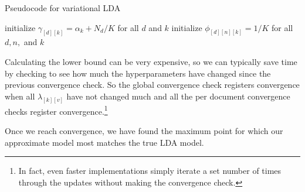 \documentclass[12pt]{article}
\begin{document}
\begin{algorithm}[H]
    \caption{Pseudocode for variational LDA}
    \DontPrintSemicolon
    initialize $\gamma_{[d][k]} = \alpha_{k} + N_{d} / K$ for all $d$ and $k$\;
    initialize $\phi_{[d][n][k]} = 1 / K$ for all $d, n,$ and $k$\;
\end{algorithm}

Calculating the lower bound can be very expensive, so we can typically save time
by checking to see how much the hyperparameters have changed since the previous
convergence check.  So the global convergence check registers convergence when
all $\lambda_{[k][v]}$ have not changed much and all the per document
convergence checks register convergence.\footnote{In fact, even faster
implementations simply iterate a set number of times through the updates without
making the convergence check.}

Once we reach convergence, we have found the maximum point for which our
approximate model most matches the true LDA model.
\end{document}
